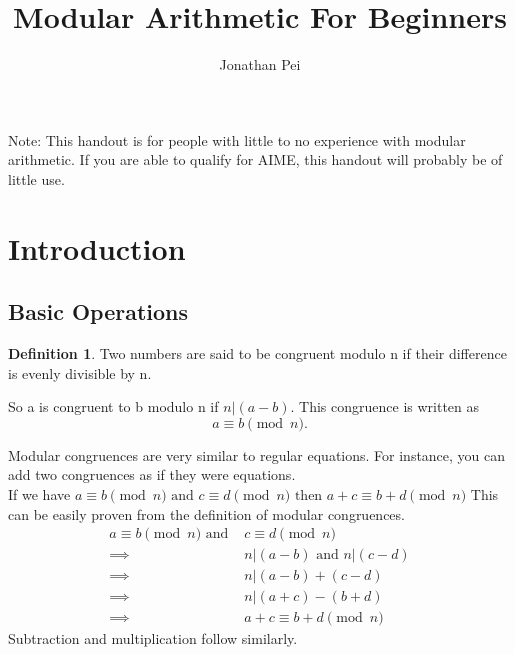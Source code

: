 \documentclass[letterpaper]{article}
\theoremstyle{plain}
\theoremstyle{definition}
\newtheorem{definition}[thm]{Definition}
\theoremstyle{remark}
\begin{document}
\title{Modular Arithmetic For Beginners}
\author{Jonathan Pei}
\maketitle
Note: This handout is for people with little to no experience with modular arithmetic. If you are able to qualify for AIME, this handout will probably be of little use.
\section{Introduction}
\subsection*{Basic Operations}
\begin{mdframed}
\begin{definition}
    Two numbers are said to be congruent modulo n if their difference is evenly divisible by n.\\
\end{definition} 
\end{mdframed}
So a is congruent to b modulo n if $n | (a-b)$. 
This congruence is written as 
$$ a \equiv b \pmod{n}.$$

Modular congruences are very similar to regular equations. For instance, you can add two congruences as if they were equations.\\
If we have 
$
    a \equiv b \pmod{n} \text{ and } c \equiv d \pmod{n} \text{ then } a+c \equiv b+d \pmod{n}
$
This can be easily proven from the definition of modular congruences. 
\begin{align*}
    a \equiv b \pmod{n} \text{  and  } &c \equiv d \pmod{n}\\
    \implies &n|(a-b) \text{  and  } n|(c-d) \\
    \implies &n|(a-b)+(c-d)\\
    \implies &n|(a+c)-(b+d)\\
    \implies &\boxed{a+c \equiv b+d \pmod{n}}
\end{align*}
Subtraction and multiplication follow similarly.\\
\end{document}
